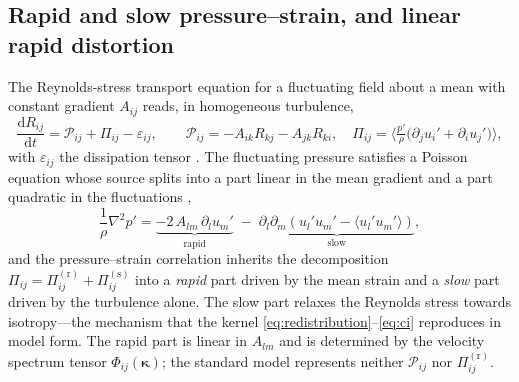 \documentclass[11pt,a4paper]{article}
\begin{document}
\subsection{Rapid and slow pressure--strain, and linear rapid
distortion}\label{sec:rapid-slow}

The Reynolds-stress transport equation for a fluctuating field about a
mean with constant gradient $A_{ij}$ reads, in homogeneous turbulence,
\begin{equation}
  \frac{\mathrm{d}R_{ij}}{\mathrm{d}t}
  = \mathcal{P}_{ij} + \Pi_{ij} - \varepsilon_{ij},
  \qquad
  \mathcal{P}_{ij}=-A_{ik}R_{kj}-A_{jk}R_{ki},
  \quad
  \Pi_{ij}=\Big\langle \tfrac{p'}{\rho}
            \big(\partial_j u_i'+\partial_i u_j'\big)\Big\rangle,
  \label{eq:rstransport}
\end{equation}
with $\varepsilon_{ij}$ the dissipation tensor \citep{Pope2000}. The
fluctuating pressure satisfies a Poisson equation whose source splits
into a part linear in the mean gradient and a part quadratic in the
fluctuations \citep{Pope2000},
\begin{equation}
  \frac{1}{\rho}\nabla^2 p'
  = \underbrace{-2\,A_{lm}\,\partial_l u_m'}_{\text{rapid}}
    \;-\;
    \underbrace{\partial_l\partial_m\!\left(u_l' u_m'
     -\langle u_l' u_m'\rangle\right)}_{\text{slow}} ,
  \label{eq:poisson}
\end{equation}
and the pressure--strain correlation inherits the decomposition
$\Pi_{ij}=\Pi^{(\mathrm r)}_{ij}+\Pi^{(\mathrm s)}_{ij}$ into a
\emph{rapid} part driven by the mean strain and a \emph{slow} part driven
by the turbulence alone. The slow part relaxes the Reynolds stress
towards isotropy---the mechanism that the kernel
\eqref{eq:redistribution}--\eqref{eq:ci} reproduces in model form. The
rapid part is linear in $A_{lm}$ and is determined by the velocity
spectrum tensor $\Phi_{ij}(\boldsymbol{\kappa})$; the standard model
represents neither $\mathcal{P}_{ij}$ nor $\Pi^{(\mathrm r)}_{ij}$.
\end{document}
